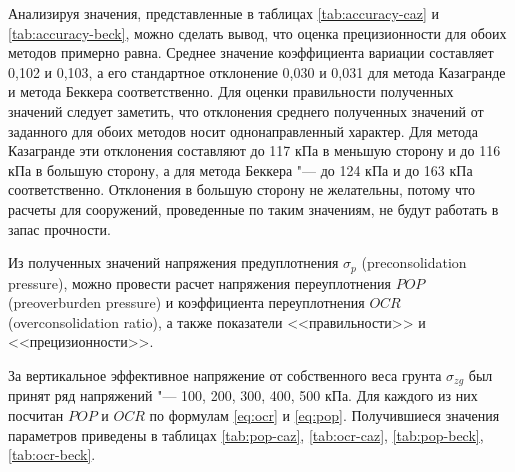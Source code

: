 Анализируя значения, представленные в таблицах \ref{tab:accuracy-caz} и \ref{tab:accuracy-beck}, можно сделать вывод, что оценка прецизионности для обоих методов примерно равна. Среднее значение коэффициента вариации составляет 0,102 и 0,103, а его стандартное отклонение 0,030 и 0,031 для метода Казагранде и метода Беккера соответственно. Для оценки правильности полученных значений следует заметить, что отклонения среднего полученных значений от заданного для обоих методов носит однонаправленный характер. Для метода Казагранде эти отклонения составляют до 117 кПа в меньшую сторону и до 116 кПа в большую сторону, а для метода Беккера "--- до 124 кПа и до 163 кПа соответственно. Отклонения в большую сторону не желательны, потому что расчеты для сооружений, проведенные по таким значениям, не будут работать в запас прочности.



Из полученных значений напряжения предуплотнения $\sigma_p$ (preconsolidation pressure), можно провести расчет напряжения переуплотнения $POP$ (preoverburden pressure) и коэффициента переуплотнения $OCR$ (overconsolidation ratio), а также показатели <<правильности>> и <<прецизионности>>.


За вертикальное эффективное напряжение от собственного веса грунта $\sigma_{zg}$ был принят ряд напряжений "--- 100, 200, 300, 400, 500 кПа.
Для каждого из них посчитан $POP$ и $OCR$ по формулам \ref{eq:ocr} и \ref{eq:pop}.
Получившиеся значения параметров приведены в таблицах \ref{tab:pop-caz}, \ref{tab:ocr-caz}, \ref{tab:pop-beck}, \ref{tab:ocr-beck}.



